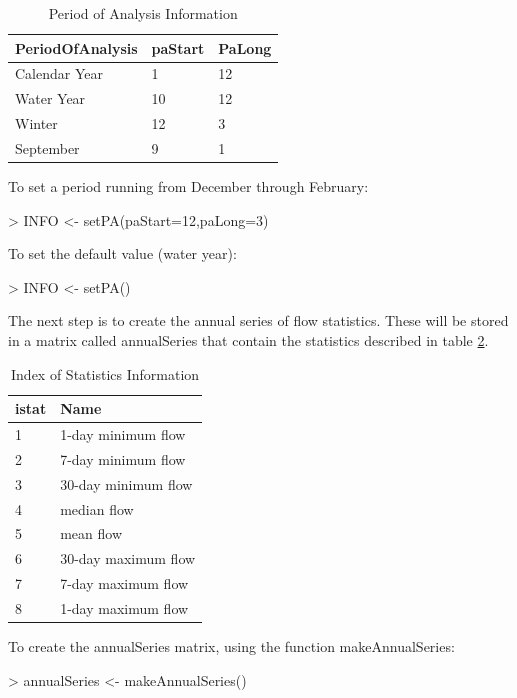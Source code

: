 \documentclass[a4paper,11pt]{article}
\begin{document}
\begin{table}[!ht]
\begin{center}
\caption{Period of Analysis Information}
\label{table:paINFO}
\begin{tabular}{lll}
  \hline
PeriodOfAnalysis & paStart & PaLong \\ 
  \hline
Calendar Year & 1 & 12 \\ 
  Water Year & 10 & 12 \\ 
  Winter & 12 & 3 \\ 
  September & 9 & 1 \\ 
   \hline
\end{tabular}
\end{center}
\end{table}
To set a period running from December through February:
\begin{Schunk}
\begin{Sinput}
> INFO <- setPA(paStart=12,paLong=3)
\end{Sinput}
\end{Schunk}

To set the default value (water year):
\begin{Schunk}
\begin{Sinput}
> INFO <- setPA()
\end{Sinput}
\end{Schunk}

The next step is to create the annual series of flow statistics.  These will be stored in a matrix called annualSeries that contain the statistics described in table \ref{table:istat}.

\begin{table}[!ht]
\begin{center}
\caption{Index of Statistics Information}
\label{table:istat}
\begin{tabular}{ll}
  \hline
istat & Name \\ 
  \hline
1 & 1-day minimum flow \\ 
  2 & 7-day minimum flow \\ 
  3 & 30-day minimum flow \\ 
  4 & median flow \\ 
  5 & mean flow \\ 
  6 & 30-day maximum flow \\ 
  7 & 7-day maximum flow \\ 
  8 & 1-day maximum flow \\ 
   \hline
\end{tabular}
\end{center}
\end{table}
To create the annualSeries matrix, using the function makeAnnualSeries:
\begin{Schunk}
\begin{Sinput}
> annualSeries <- makeAnnualSeries()
\end{Sinput}
\end{Schunk}
\end{document}
